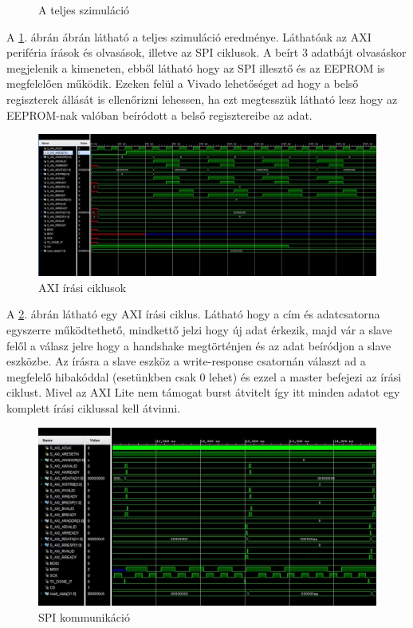 \documentclass[a4paper,11pt]{article}
\begin{document}
\begin{figure}[H]
\begin{center}
	\caption{A teljes szimuláció}
	\label{fig:sim_complete}
	\end{center}
\end{figure}

A \ref{fig:sim_complete}. ábrán ábrán látható a teljes szimuláció eredménye. Láthatóak az AXI periféria írások és olvasások, illetve az SPI ciklusok. A beírt 3 adatbájt olvasáskor megjelenik a kimeneten, ebből látható hogy az SPI illesztő és az EEPROM is megfelelően működik. Ezeken felül a Vivado lehetőséget ad hogy a belső regiszterek állását is ellenőrizni lehessen, ha ezt megtesszük látható lesz hogy az EEPROM-nak valóban beíródott a belső regisztereibe az adat.

\begin{figure}[H]
	\begin{center}
	\includegraphics[scale=0.5]{axi_write.JPG}
	\caption{AXI írási ciklusok}	
	\label{fig:axi_write}
	\end{center}
\end{figure}

A \ref{fig:axi_write}. ábrán látható egy AXI írási ciklus. Látható hogy a cím és adatcsatorna egyszerre működtethető, mindkettő jelzi hogy új adat érkezik, majd vár a slave felől a válasz jelre hogy a handshake megtörténjen és az adat beíródjon a slave eszközbe. Az írásra a slave eszköz a write-response csatornán választ ad a megfelelő hibakóddal (esetünkben csak 0 lehet) és ezzel a master befejezi az írási ciklust. Mivel az AXI Lite nem támogat burst átvitelt így itt minden adatot egy komplett írási ciklussal kell átvinni.

\begin{figure}[H]
	\begin{center}
	\includegraphics[scale=0.7]{SPI.JPG}	
	\end{center}
	\caption{SPI kommunikáció}
	\label{fig:spisim}
\end{figure}
\end{document}
